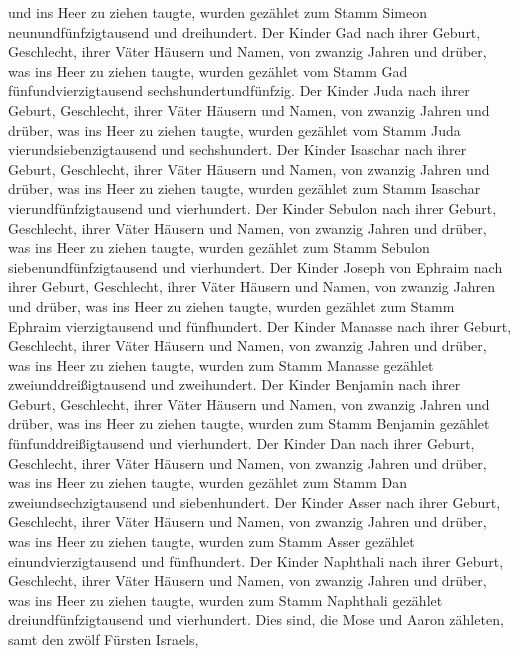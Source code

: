 und ins Heer zu ziehen taugte,  wurden gezählet zum Stamm
Simeon neunundfünfzigtausend und dreihundert.  Der Kinder
Gad nach ihrer Geburt, Geschlecht, ihrer Väter Häusern und Namen, von
zwanzig Jahren und drüber, was ins Heer zu ziehen taugte, 
wurden gezählet vom Stamm Gad fünfundvierzigtausend
sechshundertundfünfzig.  Der Kinder Juda nach ihrer Geburt,
Geschlecht, ihrer Väter Häusern und Namen, von zwanzig Jahren und
drüber, was ins Heer zu ziehen taugte,  wurden gezählet vom
Stamm Juda vierundsiebenzigtausend und sechshundert.  Der
Kinder Isaschar nach ihrer Geburt, Geschlecht, ihrer Väter Häusern und
Namen, von zwanzig Jahren und drüber, was ins Heer zu ziehen taugte,
 wurden gezählet zum Stamm Isaschar vierundfünfzigtausend
und vierhundert.  Der Kinder Sebulon nach ihrer Geburt,
Geschlecht, ihrer Väter Häusern und Namen, von zwanzig Jahren und
drüber, was ins Heer zu ziehen taugte,  wurden gezählet zum
Stamm Sebulon siebenundfünfzigtausend und vierhundert.  Der
Kinder Joseph von Ephraim nach ihrer Geburt, Geschlecht, ihrer Väter
Häusern und Namen, von zwanzig Jahren und drüber, was ins Heer zu ziehen
taugte,  wurden gezählet zum Stamm Ephraim vierzigtausend
und fünfhundert.  Der Kinder Manasse nach ihrer Geburt,
Geschlecht, ihrer Väter Häusern und Namen, von zwanzig Jahren und
drüber, was ins Heer zu ziehen taugte,  wurden zum Stamm
Manasse gezählet zweiunddreißigtausend und zweihundert. 
Der Kinder Benjamin nach ihrer Geburt, Geschlecht, ihrer Väter Häusern
und Namen, von zwanzig Jahren und drüber, was ins Heer zu ziehen taugte,
 wurden zum Stamm Benjamin gezählet fünfunddreißigtausend
und vierhundert.  Der Kinder Dan nach ihrer Geburt,
Geschlecht, ihrer Väter Häusern und Namen, von zwanzig Jahren und
drüber, was ins Heer zu ziehen taugte,  wurden gezählet zum
Stamm Dan zweiundsechzigtausend und siebenhundert.  Der
Kinder Asser nach ihrer Geburt, Geschlecht, ihrer Väter Häusern und
Namen, von zwanzig Jahren und drüber, was ins Heer zu ziehen taugte,
 wurden zum Stamm Asser gezählet einundvierzigtausend und
fünfhundert.  Der Kinder Naphthali nach ihrer Geburt,
Geschlecht, ihrer Väter Häusern und Namen, von zwanzig Jahren und
drüber, was ins Heer zu ziehen taugte,  wurden zum Stamm
Naphthali gezählet dreiundfünfzigtausend und vierhundert. 
Dies sind, die Mose und Aaron zähleten, samt den zwölf Fürsten Israels,
